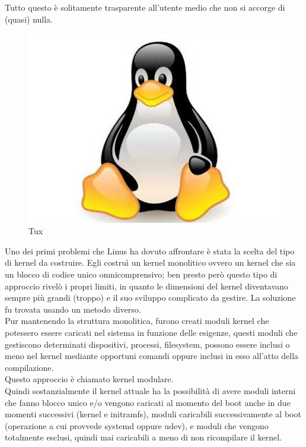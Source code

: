 Tutto questo è solitamente trasparente all'utente medio che non si accorge di (quasi) nulla.\\

\begin{figure}[!htbp]
\centering
\includegraphics[scale=.20]{articoli/sistema_avanzato/immagini/tux.jpg}
\caption{Tux}
\end{figure}

Uno dei primi problemi che Linus ha dovuto affrontare è stata la scelta del tipo di kernel da costruire.
Egli costruì un kernel monolitico ovvero un kernel che sia un blocco di codice unico omnicomprensivo; ben presto però questo tipo di approccio rivelò i propri limiti, in quanto le dimensioni del kernel diventavano sempre più grandi (troppo) e il suo sviluppo complicato da gestire. La soluzione fu trovata usando un metodo diverso.\\

Pur mantenendo la struttura monolitica, furono creati moduli kernel che potessero essere caricati nel sistema in funzione delle esigenze, questi moduli che gestiscono determinati dispositivi, processi, filesystem, possono essere inclusi o meno nel kernel mediante opportuni comandi oppure inclusi in esso all'atto della compilazione.\\

Questo approccio è chiamato kernel modulare.\\

Quindi sostanzialmente il kernel attuale ha la possibilità di avere moduli interni che fanno blocco unico e/o vengono caricati al momento del boot anche in due momenti  successivi (kernel e initramfs), moduli caricabili successivamente al boot (operazione a cui provvede systemd oppure udev), e moduli che vengono totalmente esclusi, quindi mai caricabili a meno di non ricompilare il kernel.\\


